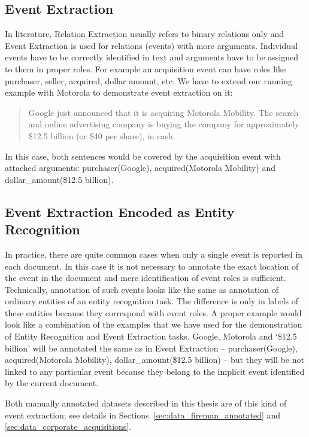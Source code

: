 \subsection{Event Extraction}

In literature, Relation Extraction usually refers to binary relations only and Event Extraction is used for relations (events) with more arguments. Individual events have to be correctly identified in text and arguments have to be assigned to them in proper roles. For example an acquisition event can have roles like purchaser, seller, acquired, dollar amount, etc. We have to extend our running example with Motorola to demonstrate event extraction on it:

\begin{quote}
Google just announced that it is acquiring Motorola Mobility. The search and online advertising company is buying the company for approximately \$12.5 billion (or \$40 per share), in cash.
\end{quote}

In this case, both sentences would be covered by the acquisition event with attached arguments: purchaser(Google), acquired(Motorola Mobility) and dollar\_amount(\$12.5 billion).


\subsection{Event Extraction Encoded as Entity Recognition} \label{sec:problems_event_entities}

In practice, there are quite common cases when only a single event is reported in each document. In this case it is not necessary to annotate the exact location of the event in the document and mere identification of event roles is sufficient. Technically, annotation of such events looks like the same as annotation of ordinary entities of an entity recognition task. The difference is only in labels of these entities because they correspond with event roles. A proper example would look like a combination of the examples that we have used for the demonstration of Entity Recognition and Event Extraction tasks. Google, Motorola and `\$12.5 billion' will be annotated the same as in Event Extraction -- purchaser(Google), acquired(Motorola Mobility), dollar\_amount(\$12.5 billion) -- but they will be not linked to any particular event because they belong to the implicit event identified by the current document.

Both manually annotated datasets described in this thesis are of this kind of event extraction; see details in Sections~\ref{sec:data_fireman_annotated} and \ref{sec:data_corporate_acquisitions}. 


